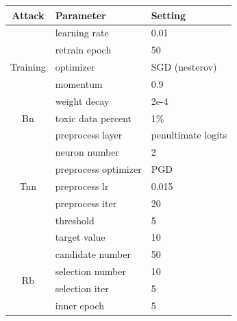 \documentclass[compsoc,conference,a4paper,10pt,times]{IEEEtran}
\newcommand{\bn}{{\sc Bn}\xspace}
\newcommand{\tnn}{{\sc Tnn}\xspace}
\newcommand{\rfb}{{\sc Rb}\xspace}
\begin{document}
\begin{table}[!ht]{\footnotesize 
        \centering
        \renewcommand{\arraystretch}{1.2}
        \setlength{\tabcolsep}{2pt}
        \begin{tabular}{c|l|l}
             {Attack}                    & {Parameter}                              & {Setting}             \\
            \hline
            \hline
            \multirow{5}{*}{Training} & learning rate             & 0.01                    \\
                                      & retrain epoch             & 50                      \\
                                      & optimizer                 & SGD (nesterov)          \\
                                      & momentum                  & 0.9                     \\
                                      & weight decay              & 2e-4                    \\
            \hline

            \multirow{1}{*}{\bn}      & toxic data percent        & 1\%                     \\
            \hline

            \multirow{7}{*}{\tnn}     & preprocess layer          & penultimate logits           \\ %
                                      & neuron number             & 2                       \\
                                      & preprocess optimizer      & PGD                     \\
                                      & preprocess lr             & 0.015                   \\
                                      & preprocess iter           & 20                      \\
                                      & threshold                 & 5                       \\
                                      & target value              & 10                      \\
            \hline


            \multirow{4}{*}{\rfb}     & candidate number          & 50                      \\
                                      & selection number          & 10                      \\
                                      & selection iter            & 5                       \\
                                      & inner epoch               & 5                       \\
            \hline


\end{tabular}}
\end{table}
\end{document}
